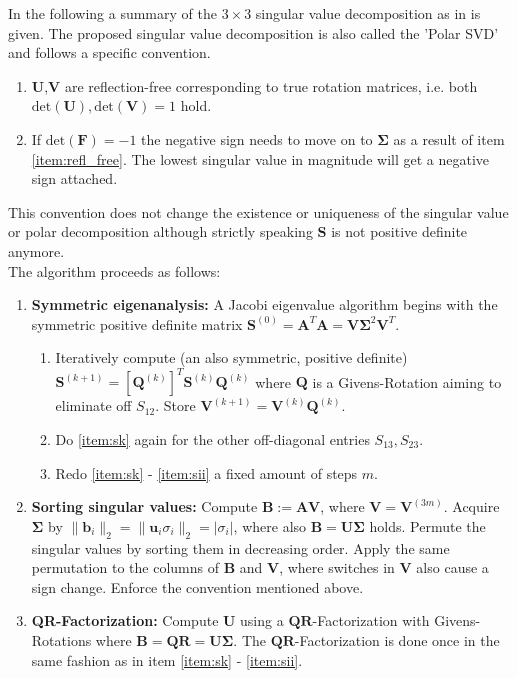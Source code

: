 \documentclass[m,times]{cgMA}
\begin{document}
In the following a summary of the $3 \times 3$ singular value decomposition as in \cite{SVD:3x3} is given. The proposed singular value decomposition is also called the 'Polar SVD' and follows a specific convention.
\begin{enumerate}\label{ref:itemize_conv}
  \item\label{item:refl_free} $\boldsymbol{U}$,$\boldsymbol{V}$ are reflection-free corresponding to true rotation matrices, i.e. both $\text{det}(\boldsymbol{U}), \text{det}(\boldsymbol{V}) = 1$ hold.
  \item If $\text{det}(\boldsymbol{F}) = -1$ the negative sign needs to move on to $\boldsymbol{\Sigma}$ as a result of item \ref{item:refl_free}. The lowest singular value in magnitude will get a negative sign attached.
  \end{enumerate}
This convention does not change the existence or uniqueness of the singular value or polar decomposition although strictly speaking $\boldsymbol{S}$ is not positive definite anymore.
\\
The algorithm proceeds as follows:
\begin{enumerate}
  \item \label{it:eig} \textbf{Symmetric eigenanalysis:} A Jacobi eigenvalue algorithm begins with the symmetric positive definite matrix $\boldsymbol { S } ^{(0)}= \boldsymbol { A } ^ { T } \boldsymbol { A } = \boldsymbol { V } \boldsymbol { \Sigma } ^ { 2 } \boldsymbol { V } ^ { T }$.
    \begin{enumerate}[label*=\arabic*.]
      \item \label{item:sk} Iteratively compute (an also symmetric, positive definite) $\boldsymbol { S } ^ { ( k + 1 ) } = [ \boldsymbol { Q } ^ { ( k )}] ^ { T } \boldsymbol { S } ^ { ( k ) } \boldsymbol { Q } ^ { ( k ) }$ where $\boldsymbol{Q}$ is a Givens-Rotation aiming to eliminate off $S_{12}$. Store $\boldsymbol{V}^{(k+1)} = \boldsymbol{V}^{(k)}  \boldsymbol{Q}^{(k)}$.
      \item \label{item:sii} Do \ref{item:sk} again for the other off-diagonal entries $S_{13},S_{23}$.
      \item \label{item:redo_sii} Redo \ref{item:sk} - \ref{item:sii} a fixed amount of steps $m$.
    \end{enumerate}
  \item \textbf{Sorting singular values:} Compute $\boldsymbol{B} := \boldsymbol{AV}$, where $\boldsymbol{V} = \boldsymbol{V}^{(3m)}$. Acquire $\boldsymbol{\Sigma}$ by $\|\boldsymbol{b}_i \|_2 = \|\boldsymbol{u}_i\sigma_i\|_2 = |\sigma_i|$, where also $\boldsymbol{B=U\Sigma}$ holds. Permute the singular values by sorting them in decreasing order. Apply the same permutation to the columns of $\boldsymbol{B}$ and $\boldsymbol{V}$, where switches in $\boldsymbol{V}$ also cause a sign change. Enforce the convention mentioned above.
  \item \label{item:qr} \textbf{QR-Factorization:} Compute $\boldsymbol{U}$ using a $\boldsymbol{QR}$-Factorization with Givens-Rotations where $\boldsymbol{B}=\boldsymbol{QR}=\boldsymbol{U\Sigma}$. The $\boldsymbol{QR}$-Factorization is done once in the same fashion as in item \ref{item:sk} - \ref{item:sii}.
\end{enumerate}
\end{document}
